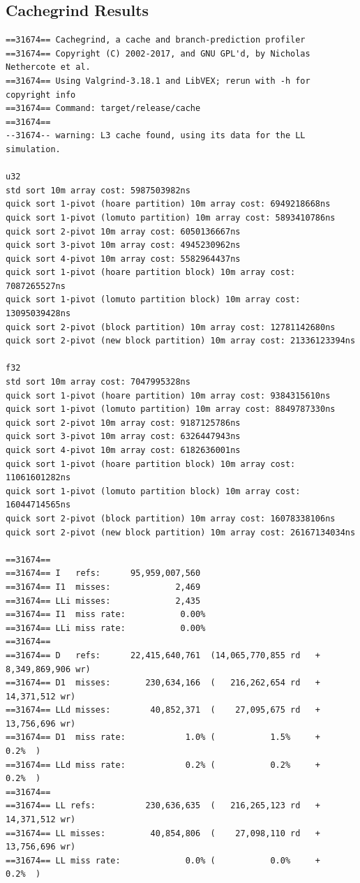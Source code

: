 \documentclass{article}
\begin{document}
\subsection{Cachegrind Results}
\hypertarget{cachegrindresult}{}
\small
\begin{verbatim}
==31674== Cachegrind, a cache and branch-prediction profiler
==31674== Copyright (C) 2002-2017, and GNU GPL'd, by Nicholas Nethercote et al.
==31674== Using Valgrind-3.18.1 and LibVEX; rerun with -h for copyright info
==31674== Command: target/release/cache
==31674== 
--31674-- warning: L3 cache found, using its data for the LL simulation.

u32
std sort 10m array cost: 5987503982ns
quick sort 1-pivot (hoare partition) 10m array cost: 6949218668ns
quick sort 1-pivot (lomuto partition) 10m array cost: 5893410786ns
quick sort 2-pivot 10m array cost: 6050136667ns
quick sort 3-pivot 10m array cost: 4945230962ns
quick sort 4-pivot 10m array cost: 5582964437ns
quick sort 1-pivot (hoare partition block) 10m array cost: 7087265527ns
quick sort 1-pivot (lomuto partition block) 10m array cost: 13095039428ns
quick sort 2-pivot (block partition) 10m array cost: 12781142680ns
quick sort 2-pivot (new block partition) 10m array cost: 21336123394ns

f32
std sort 10m array cost: 7047995328ns
quick sort 1-pivot (hoare partition) 10m array cost: 9384315610ns
quick sort 1-pivot (lomuto partition) 10m array cost: 8849787330ns
quick sort 2-pivot 10m array cost: 9187125786ns
quick sort 3-pivot 10m array cost: 6326447943ns
quick sort 4-pivot 10m array cost: 6182636001ns
quick sort 1-pivot (hoare partition block) 10m array cost: 11061601282ns
quick sort 1-pivot (lomuto partition block) 10m array cost: 16044714565ns
quick sort 2-pivot (block partition) 10m array cost: 16078338106ns
quick sort 2-pivot (new block partition) 10m array cost: 26167134034ns

==31674== 
==31674== I   refs:      95,959,007,560
==31674== I1  misses:             2,469
==31674== LLi misses:             2,435
==31674== I1  miss rate:           0.00%
==31674== LLi miss rate:           0.00%
==31674== 
==31674== D   refs:      22,415,640,761  (14,065,770,855 rd   + 8,349,869,906 wr)
==31674== D1  misses:       230,634,166  (   216,262,654 rd   +    14,371,512 wr)
==31674== LLd misses:        40,852,371  (    27,095,675 rd   +    13,756,696 wr)
==31674== D1  miss rate:            1.0% (           1.5%     +           0.2%  )
==31674== LLd miss rate:            0.2% (           0.2%     +           0.2%  )
==31674== 
==31674== LL refs:          230,636,635  (   216,265,123 rd   +    14,371,512 wr)
==31674== LL misses:         40,854,806  (    27,098,110 rd   +    13,756,696 wr)
==31674== LL miss rate:             0.0% (           0.0%     +           0.2%  )


\end{verbatim}
\end{document}
